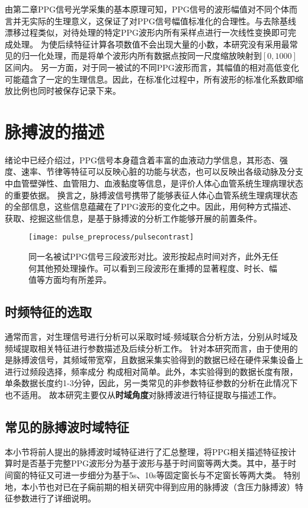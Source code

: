 由第二章PPG信号光学采集的基本原理可知，PPG信号的波形幅值对不同个体而言并无实际的生理意义，这保证了对PPG信号幅值标准化的合理性。与去除基线漂移过程类似，对待处理的特定PPG波形内所有采样点进行一次线性变换即可完成处理。
为使后续特征计算各项数值不会出现大量的小数，本研究没有采用最常见的归一化处理，而是将单个波形内所有数据点按同一尺度缩放映射到$[0,1000]$区间内。
另一方面，对于同一被试的不同PPG波形而言，其幅值的相对高低变化可能蕴含了一定的生理信息。因此，在标准化过程中，所有波形的标准化系数即缩放比例也同时被保存记录下来。

\section{脉搏波的描述}
绪论中已经介绍过，PPG信号本身蕴含着丰富的血液动力学信息，其形态、强度、速率、节律等特征可以反映心脏的功能与状态，也可以反映出各级动脉及分支中血管壁弹性、血管阻力、血液黏度等信息，是评价人体心血管系统生理病理状态的重要依据\cite{PPGYY}。
换言之，脉搏波信号携带了能够表征人体心血管系统生理病理状态的全部信息，这些信息蕴藏在了PPG波形的变化之中。因此，用何种方式描述、获取、挖掘这些信息，是基于脉搏波的分析工作能够开展的前置条件。
\begin{figure}[htbp]
    \centering
    \texttt{[image: pulse\_preprocess/pulsecontrast]}
    \caption[同一名被试PPG信号三段波形对比]{\label{fig:pulsecontrast}同一名被试PPG信号三段波形对比。波形按起点时间对齐，此外无任何其他预处理操作。可以看到三段波形在重搏的显著程度、时长、幅值等方面均有所差异。}
\end{figure}
\subsection{时频特征的选取}
通常而言，对生理信号进行分析可以采取时域-频域联合分析方法，分别从时域及频域提取相关特征进行参数描述及后续分析工作。
针对本研究而言，由于使用的是脉搏波信号，其频域带宽窄，且数据采集实验得到的数据已经在硬件采集设备上进行过频段选择，频率成分
构成相对简单。此外，本实验得到的数据长度有限，单条数据长度约1-3分钟，因此，另一类常见的非参数特征参数的分析在此情况下也不适用。
故本研究主要仅从\textbf{时域角度}对脉搏波进行特征提取与描述工作。

\subsection{常见的脉搏波时域特征}
本小节将前人提出的脉搏波时域特征进行了汇总整理，将PPG相关描述特征按计算时是否基于完整PPG波形分为基于波形与基于时间窗等两大类。其中，基于时间窗的特征又可进一步细分为基于5s、10s等固定窗长与不定窗长等两大类。
特别地，本小节也对已在子痫前期的相关研究中得到应用的脉搏波（含压力脉搏波）特征参数进行了详细说明。

